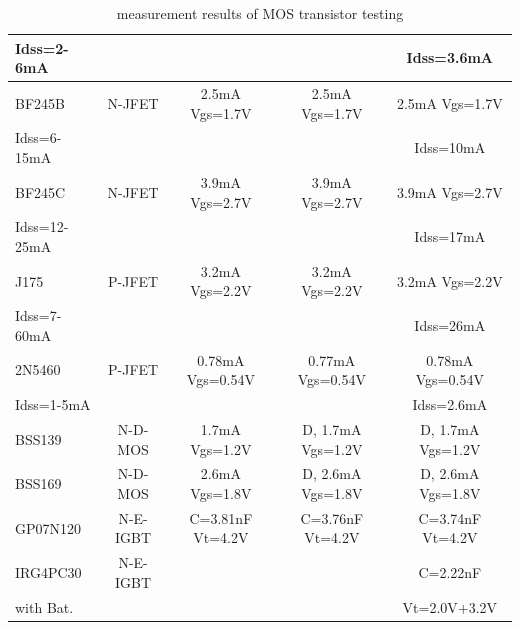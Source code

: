 \begin{table}[H]
\begin{center}
\begin{tabular}{| l | c | c | c | c |}
Idss=2-6mA   &         &                  &                  & Idss=3.6mA      \\
    \hline
BF245B       & N-JFET  & 2.5mA Vgs=1.7V   & 2.5mA Vgs=1.7V   & 2.5mA Vgs=1.7V \\
Idss=6-15mA  &         &                  &                  & Idss=10mA      \\
    \hline
BF245C       & N-JFET  & 3.9mA Vgs=2.7V   & 3.9mA Vgs=2.7V   & 3.9mA Vgs=2.7V \\
Idss=12-25mA &         &                  &                  & Idss=17mA    \\
    \hline
J175        & P-JFET   & 3.2mA Vgs=2.2V   & 3.2mA Vgs=2.2V   & 3.2mA Vgs=2.2V \\
Idss=7-60mA &          &                  &                  & Idss=26mA      \\
    \hline
2N5460      & P-JFET   & 0.78mA Vgs=0.54V & 0.77mA Vgs=0.54V & 0.78mA Vgs=0.54V \\
Idss=1-5mA  &          &                  &                  & Idss=2.6mA       \\
    \hline
BSS139      & N-D-MOS  & 1.7mA Vgs=1.2V  & D, 1.7mA Vgs=1.2V & D, 1.7mA Vgs=1.2V \\
    \hline
BSS169      & N-D-MOS  & 2.6mA Vgs=1.8V  & D, 2.6mA Vgs=1.8V & D, 2.6mA Vgs=1.8V \\
    \hline
GP07N120    & N-E-IGBT & C=3.81nF Vt=4.2V & C=3.76nF Vt=4.2V & C=3.74nF Vt=4.2V \\
    \hline
IRG4PC30    & N-E-IGBT &                  &                  & C=2.22nF         \\
with Bat.   &          &                  &                  & Vt=2.0V+3.2V \\
    \hline
    \end{tabular}
  \end{center}
  \caption{measurement results of MOS transistor testing}
  \label{tab:mos} 
\end{table}
